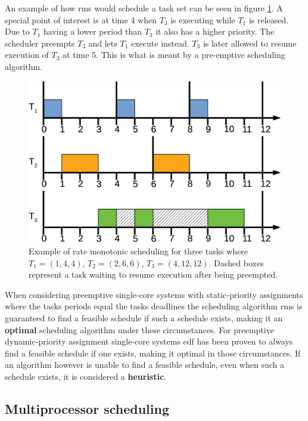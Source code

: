 \documentclass{kththesis}
\begin{document}
An example of how \acrshort{rms} would schedule a task set can be seen in figure
\ref{fig:rate_monotonic_scheduling}. A special point of interest is at time 4 when $T_3$ is
executing while $T_1$ is released. Due to $T_1$ having a lower period than $T_3$ it also has a
higher priority. The scheduler preempts $T_3$ and lets $T_1$ execute instead. $T_3$ is later allowed
to resume execution of $T_3$ at time 5. This is what is meant by a pre-emptive scheduling algorithm.

\begin{figure}

    \centering

    \includegraphics[width=0.8\linewidth]{images/rate-monotonic-scheduling.pdf}

    \caption{Example of rate monotonic scheduling for three tasks where $T_1=(1, 4, 4)$, $T_2=(2, 6,
    6)$, $T_3=(4, 12, 12)$. Dashed boxes represent a task waiting to resume execution after being
    preempted.} 

    \label{fig:rate_monotonic_scheduling}

\end{figure}

When considering preemptive single-core systems with static-priority assignments where the tasks
periods equal the tasks deadlines the scheduling algorithm \acrshort{rms} is guaranteed to find a
feasible schedule if such a schedule exists, making it an \textbf{optimal} scheduling algorithm
under these circumstances. For preemptive dynamic-priority assignment single-core systems
\acrshort{edf} has been proven to always find a feasible schedule if one exists, making it optimal
in those circumstances. If an algorithm however is unable to find a feasible schedule, even when
such a schedule exists, it is considered a \textbf{heuristic}.

\subsection{Multiprocessor scheduling} \label{subsec:multiprocessor_scheduling}
\end{document}

